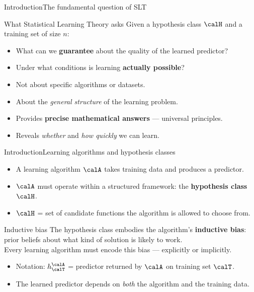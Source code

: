 \begin{frame}{Introduction}{The fundamental question of SLT}
  \begin{block}{What Statistical Learning Theory asks}
    Given a hypothesis class $\calH$ and a training set of size $n$:
    \begin{itemize}
      \item What can we \textbf{guarantee} about the quality of the learned predictor?
      \item Under what conditions is learning \textbf{actually possible}?
    \end{itemize}
  \end{block}
  \bigskip
  \begin{itemize}
    \item Not about specific algorithms or datasets.
    \item About the \emph{general structure} of the learning problem.
    \item Provides \textbf{precise mathematical answers} — universal principles.
    \item Reveals \emph{whether} and \emph{how quickly} we can learn.
  \end{itemize}
\end{frame}

\begin{frame}{Introduction}{Learning algorithms and hypothesis classes}
  \begin{itemize}
    \item A learning algorithm $\calA$ takes training data and produces a predictor.
    \item $\calA$ must operate within a structured framework: the
          \textcolor{AccentBlue}{\textbf{hypothesis class}} $\calH$.
    \item $\calH$ = set of candidate functions the algorithm is allowed to choose from.
  \end{itemize}
  \bigskip
  \begin{block}{Inductive bias}
    The hypothesis class embodies the algorithm's
    \textcolor{AccentBlue}{\textbf{inductive bias}}: prior beliefs about what kind of
    solution is likely to work.\\[4pt]
    Every learning algorithm must encode this bias — explicitly or implicitly.
  \end{block}
  \bigskip
  \begin{itemize}
    \item Notation: $h^\calA_\calT$ = predictor returned by $\calA$ on training set $\calT$.
    \item The learned predictor depends on \emph{both} the algorithm and the training data.
  \end{itemize}
\end{frame}

